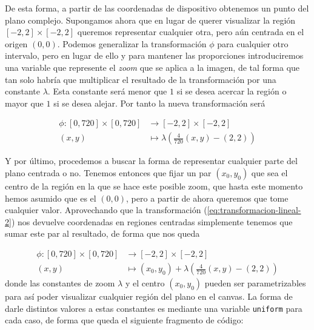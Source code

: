 De esta forma, a partir de las coordenadas de dispositivo obtenemos un punto del plano complejo. Supongamos ahora que en lugar de querer visualizar la región $[-2,2]\times[-2,2]$ queremos representar cualquier otra, pero aún centrada en el origen $(0,0)$. Podemos generalizar la transformación $\phi$ para cualquier otro intervalo, pero en lugar de ello y para mantener las proporciones introduciremos una variable que represente el \textit{zoom} que se aplica a la imagen, de tal forma que tan solo habría que multiplicar el resultado de la transformación por una constante $\lambda$. Esta constante será menor que $1$ si se desea acercar la región o mayor que $1$ si se desea alejar. Por tanto la nueva transformación será

\begin{equation}
    \label{eq:transformacion-lineal-2}
    \begin{split}
        \phi:[0,720]\times[0,720] & \longrightarrow [-2,2]\times[-2,2] \\
        (x,y) & \longmapsto \lambda\left(\frac{4}{720}(x,y)-(2,2)\right)
    \end{split}
\end{equation}

Y por último, procedemos a buscar la forma de representar cualquier parte del plano centrada o no. Tenemos entonces que fijar un par $(x_0,y_0)$ que sea el centro de la región en la que se hace este posible zoom, que hasta este momento hemos asumido que es el $(0,0)$, pero a partir de ahora queremos que tome cualquier valor. Aprovechando que la transformación (\ref{eq:transformacion-lineal-2}) nos devuelve coordenadas en regiones centradas simplemente tenemos que sumar este par al resultado, de forma que nos queda 

\begin{equation}
    \label{eq:transformacion-lineal-3}
    \begin{split}
        \phi:[0,720]\times[0,720] & \longrightarrow [-2,2]\times[-2,2] \\
        (x,y) & \longmapsto (x_0,y_0) + \lambda\left(\frac{4}{720}(x,y)-(2,2)\right)
    \end{split}
\end{equation}
donde las constantes de zoom $\lambda$ y el centro $(x_0,y_0)$ pueden ser parametrizables para así poder visualizar cualquier región del plano en el canvas. La forma de darle distintos valores a estas constantes es mediante una variable \verb|uniform| para cada caso, de forma que queda el siguiente fragmento de código:


